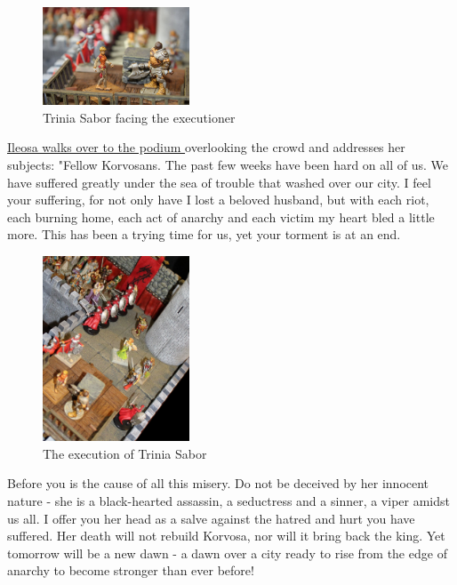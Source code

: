 \begin{figure}[h]
	\centering
	\includegraphics[width=0.39\textwidth]{images/Trinia-Sabor-facing-the-executioner-470603042.jpg}
	\caption{Trinia Sabor facing the executioner}
	\label{fig:Trinia-Sabor-facing-the-executioner-470603042}
\end{figure}

\hyperref[fig:The-execution-of-Trinia-Sabor-470602177]{ Ileosa walks over to the podium } overlooking the crowd and addresses her subjects: "Fellow Korvosans. The past few weeks have been hard on all of us. We have suffered greatly under the sea of trouble that washed over our city. I feel your suffering, for not only have I lost a beloved husband, but with each riot, each burning home, each act of anarchy and each victim my heart bled a little more. This has been a trying time for us, yet your torment is at an end. \\

\begin{figure}[h]
	\centering
	\includegraphics[width=0.39\textwidth]{images/The-execution-of-Trinia-Sabor-470602177.jpg}
	\caption{The execution of Trinia Sabor}
	\label{fig:The-execution-of-Trinia-Sabor-470602177}
\end{figure}

Before you is the cause of all this misery. Do not be deceived by her innocent nature - she is a black-hearted assassin, a seductress and a sinner, a viper amidst us all. I offer you her head as a salve against the hatred and hurt you have suffered. Her death will not rebuild Korvosa, nor will it bring back the king. Yet tomorrow will be a new dawn - a dawn over a city ready to rise from the edge of anarchy to become stronger than ever before!\\

